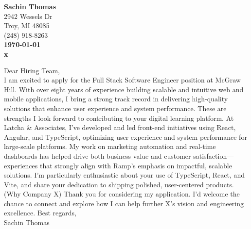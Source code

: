 
\noindent \textbf{Sachin Thomas} \\
2942 Wessels Dr \\
Troy, MI 48085 \\
(248) 918-8263 \\
\vspace{8pt}
\noindent \textbf{\today} \\
\vspace{4pt}
\noindent \textbf{x}
\newline

\noindent Dear Hiring Team, \\

\noindent I am excited to apply for the Full Stack Software Engineer position at McGraw Hill. With over eight years of experience building scalable and intuitive web and mobile applications, I bring a strong track record in delivering high-quality solutions that enhance user experience and system performance. These are strengths I look forward to contributing to your digital learning platform.
\newline\newline
\noindent At Latcha \& Associates, I've developed and led front-end initiatives using React, Angular, and TypeScript, optimizing user experience and system performance for large-scale platforms. My work on marketing automation and real-time dashboards has helped drive both business value and customer satisfaction—experiences that strongly align with Ramp's emphasis on impactful, scalable solutions. I'm particularly enthusiastic about your use of TypeScript, React, and Vite, and share your dedication to shipping polished, user-centered products.
\newline\newline
\noindent (Why Company X)
\newline\newline
Thank you for considering my application. I'd welcome the chance to connect and explore how I can help further X's vision and engineering excellence.
\newline\newline
\noindent Best regards,\\
\noindent Sachin Thomas

